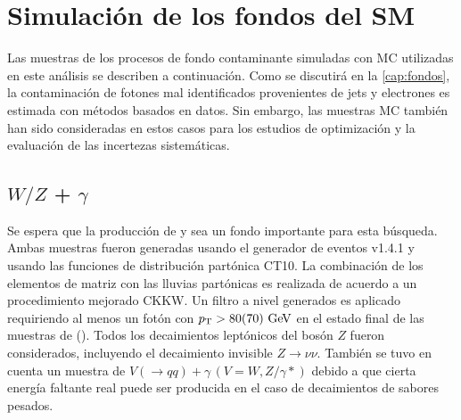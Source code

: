\section{Simulación de los fondos del SM}
\label{sec:bkg_samples}

\newcommand{\mccaption}{Se detallan la sección eficaz a LO para cada modo de decaimiento,
  los factores $k$ (para la normalización NLO) y las eficiencias del filtro,
  así como también la luminosidad integrada correspondiente
  a la estadística total de cada muestra.}


Las muestras de los procesos de fondo contaminante simuladas con MC utilizadas
en este análisis se describen a continuación. Como se discutirá en la
\cref{cap:fondos}, la contaminación de fotones mal identificados
provenientes de jets y electrones es estimada con métodos basados en datos. Sin
embargo, las muestras MC también han sido consideradas en estos casos para los
estudios de optimización y la evaluación de las incertezas sistemáticas.

\subsection{$W/Z$ + $\gamma$}

Se espera que la producción de {\wgam} y {\zgam} sea un fondo importante
para esta búsqueda. Ambas muestras fueron generadas usando el generador
de eventos {\sherpa} v1.4.1\cite{SherpaGen} y
usando las funciones de distribución partónica CT10.
La combinación de los elementos de matriz con las lluvias partónicas
es realizada de acuerdo a un procedimiento mejorado CKKW\cite{Catani:2001cc,Krauss:2002up}.
Un filtro a nivel generados es aplicado requiriendo al menos un fotón
con $\pt > 80(70) \gev$ en el estado final de las muestras de {\wgam} (\zgam).
Todos los decaimientos leptónicos del bosón $Z$ fueron considerados,
incluyendo el decaimiento invisible $Z\to\nu\nu$.
También se tuvo en cuenta un muestra de $V(\to qq)+\gamma\,  (V=W,Z/\gamma*)$
debido a que cierta energía faltante real puede  ser producida en el caso
de decaimientos de sabores pesados.

